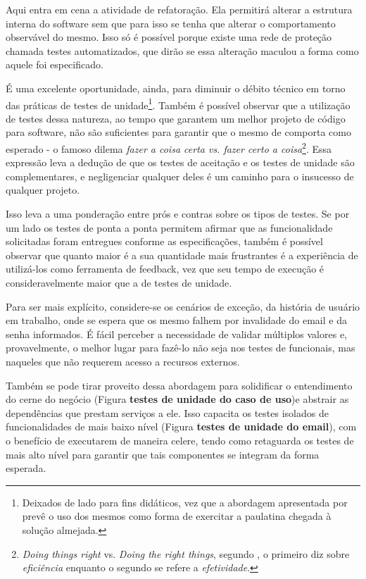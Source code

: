   Aqui entra em cena a atividade de refatoração. Ela permitirá alterar a estrutura interna do software sem que para isso se tenha que alterar o comportamento observável do mesmo. Isso só é possível porque existe uma rede de proteção chamada testes automatizados, que dirão se essa alteração maculou a forma como aquele foi especificado.

  É uma excelente oportunidade, ainda, para diminuir o débito técnico em torno das práticas de testes de unidade\footnote{Deixados de lado para fins didáticos, vez que a abordagem apresentada por  prevê o uso dos mesmos como forma de exercitar a paulatina chegada à solução almejada.}. Também é possível observar que a utilização de testes dessa natureza, ao tempo que garantem um melhor projeto de código para software, não são suficientes para garantir que o mesmo de comporta como esperado - o famoso dilema \emph{fazer a coisa certa vs. fazer certo a coisa}\footnote{\emph{Doing things right} vs. \emph{Doing the right things}, segundo , o primeiro diz sobre \emph{eficiência} enquanto o segundo se refere a \emph{efetividade}.}. Essa expressão leva a dedução de que os testes de aceitação e os testes de unidade são complementares, e negligenciar qualquer deles é um caminho para o insucesso de qualquer projeto.

  Isso leva a uma ponderação entre prós e contras sobre os tipos de testes. Se por um lado os testes de ponta a ponta permitem afirmar que as funcionalidade solicitadas foram entregues conforme as especificações, também é possível observar que quanto maior é a sua quantidade mais frustrantes é a experiência de utilizá-los como ferramenta de feedback, vez que seu tempo de execução é consideravelmente maior que a de testes de unidade.

  Para ser mais explícito, considere-se os cenários de exceção, da história de usuário em trabalho, onde se espera que os mesmo falhem por invalidade do email e da senha informados. É fácil perceber a necessidade de validar múltiplos valores e, provavelmente, o melhor lugar para fazê-lo não seja nos testes de funcionais, mas naqueles que não requerem acesso a recursos externos.

  Também se pode tirar proveito dessa abordagem para solidificar o entendimento do cerne do negócio (Figura \textbf{testes de unidade do caso de uso})e abstrair as dependências que prestam serviços a ele. Isso capacita os testes isolados de funcionalidades de mais baixo nível (Figura \textbf{testes de unidade do email}), com o benefício de executarem de maneira celere, tendo como retaguarda os testes de mais alto nível para garantir que tais componentes se integram da forma esperada.

